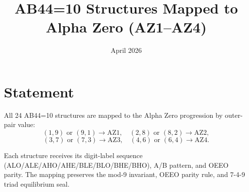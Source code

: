 \documentclass{article}
\title{AB44=10 Structures Mapped to Alpha Zero (AZ1--AZ4)}
\date{April 2026}
\begin{document}
\maketitle

\section{Statement}

All 24 AB44=10 structures are mapped to the Alpha Zero progression by outer-pair value:
\[
(1,9) \text{ or } (9,1) \to \text{AZ1}, \quad
(2,8) \text{ or } (8,2) \to \text{AZ2},
\]
\[
(3,7) \text{ or } (7,3) \to \text{AZ3}, \quad
(4,6) \text{ or } (6,4) \to \text{AZ4}.
\]

Each structure receives its digit-label sequence (ALO/ALE/AHO/AHE/BLE/BLO/BHE/BHO), A/B pattern, and OEEO parity. The mapping preserves the mod-9 invariant, OEEO parity rule, and 7-4-9 triad equilibrium seal.
\end{document}
